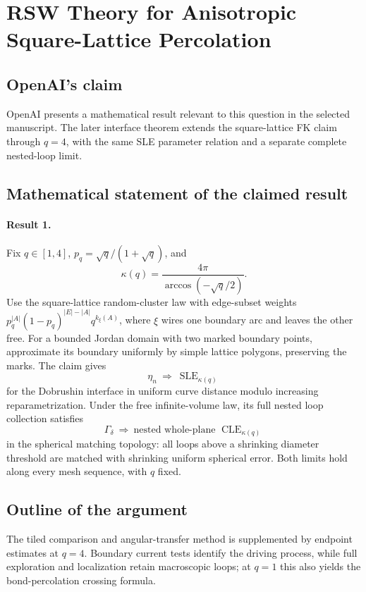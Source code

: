 \documentclass[11pt]{article}
\begin{document}
\section*{RSW Theory for Anisotropic Square-Lattice Percolation}

\subsection{OpenAI's claim}
OpenAI presents a mathematical result relevant to this question in the selected manuscript. The later interface theorem extends the square-lattice FK claim through $q=4$, with the same SLE parameter relation and a separate complete nested-loop limit.

\subsection{Mathematical statement of the claimed result}
\paragraph{Result 1.} Fix \(q\in[1,4]\), \(p_q=\sqrt q/(1+\sqrt q)\), and
\[
 \kappa(q)=\frac{4\pi}{\arccos(-\sqrt q/2)}.
\]
Use the square-lattice random-cluster law with edge-subset weights \(p_q^{|A|}(1-p_q)^{|E|-|A|}q^{k_\xi(A)}\), where \(\xi\) wires one boundary arc and leaves the other free. For a bounded Jordan domain with two marked boundary points, approximate its boundary uniformly by simple lattice polygons, preserving the marks. The claim gives
\[
 \eta_n\ \Longrightarrow\ \operatorname{SLE}_{\kappa(q)}
\]
for the Dobrushin interface in uniform curve distance modulo increasing reparametrization. Under the free infinite-volume law, its full nested loop collection satisfies
\[
 \Gamma_\delta\ \Longrightarrow\ \text{nested whole-plane }\operatorname{CLE}_{\kappa(q)}
\]
in the spherical matching topology: all loops above a shrinking diameter threshold are matched with shrinking uniform spherical error. Both limits hold along every mesh sequence, with \(q\) fixed.

\subsection{Outline of the argument}
The tiled comparison and angular-transfer method is supplemented by endpoint estimates at $q=4$. Boundary current tests identify the driving process, while full exploration and localization retain macroscopic loops; at $q=1$ this also yields the bond-percolation crossing formula.
\end{document}
